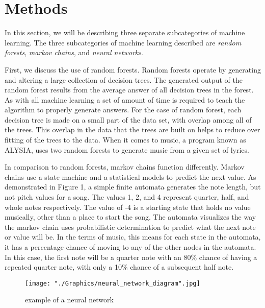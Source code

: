 \documentclass{sig-alternate}
\begin{document}
\section{Methods}
\label{sec:methods}
	In this section, we will be describing three separate subcategories of machine learning. The three subcategories of machine learning described are \textit{random forests},\textit{ markov chains}, and \textit{neural networks}.


	First, we discuss the use of random forests. Random forests operate by generating and altering a large collection of decision trees. The generated output of the random forest results from the average answer of all decision trees in the forest. As with all machine learning a set of amount of time is required to teach the algorithm to properly generate answers. For the case of random forest, each decision tree is made on a small part of the data set, with overlap among all of the trees. This overlap in the data that the trees are built on helps to reduce over fitting of the trees to the data. When it comes to music, a program known as ALYSIA, uses two random forests to generate music from a given set of lyrics.

	In comparison to random forests, markov chains function differently. Markov chains use a state machine and a statistical models to predict the next value. As demonstrated in Figure 1, a simple finite automata generates the note length, but not pitch values for a song. The values 1, 2, and 4 represent quarter, half, and whole notes respectively. The value of -4 is a starting state that holds no value musically, other than a place to start the song. The automata visualizes the way the markov chain uses probabilistic determination to predict what the next note or value will be. In the terms of music, this means for each state in the automata, it has a percentage chance of moving to any of the other nodes in the automata. In this case, the first note will be a quarter note with an 80\% chance of having a repeated quarter note, with only a 10\% chance of a subsequent half note.


\begin{figure}[H]
	\texttt{[image: "./Graphics/neural\_network\_diagram".jpg]}
	\caption{example of a neural network}
	\label{fig:neuralnetexample}
\end{figure}
	
\end{document}
